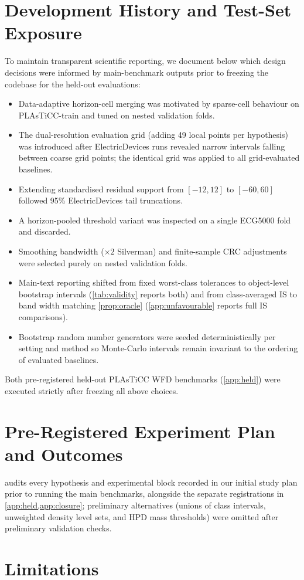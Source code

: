 \section{Development History and Test-Set Exposure}
\label{app:history}
To maintain transparent scientific reporting, we document below which design decisions were informed by main-benchmark outputs prior to freezing the codebase for the held-out evaluations:
\begin{itemize}
\item Data-adaptive horizon-cell merging was motivated by sparse-cell behaviour on PLAsTiCC-train and tuned on nested validation folds.
\item The dual-resolution evaluation grid (adding 49 local points per hypothesis) was introduced after ElectricDevices runs revealed narrow intervals falling between coarse grid points; the identical grid was applied to all grid-evaluated baselines.
\item Extending standardised residual support from $[-12,12]$ to $[-60,60]$ followed 95\% ElectricDevices tail truncations.
\item A horizon-pooled threshold variant was inspected on a single ECG5000 fold and discarded.
\item Smoothing bandwidth ($\times 2$ Silverman) and finite-sample CRC adjustments were selected purely on nested validation folds.
\item Main-text reporting shifted from fixed worst-class tolerances to object-level bootstrap intervals (\cref{tab:validity} reports both) and from class-averaged IS to band width matching \cref{prop:oracle} (\cref{app:unfavourable} reports full IS comparisons).
\item Bootstrap random number generators were seeded deterministically per setting and method so Monte-Carlo intervals remain invariant to the ordering of evaluated baselines.
\end{itemize}
Both pre-registered held-out PLAsTiCC WFD benchmarks (\cref{app:held}) were executed strictly after freezing all above choices.

\FloatBarrier
\section{Pre-Registered Experiment Plan and Outcomes}
\label{app:plan}
 audits every hypothesis and experimental block recorded in our initial study plan prior to running the main benchmarks, alongside the separate registrations in \cref{app:held,app:closure}; preliminary alternatives (unions of class intervals, unweighted density level sets, and HPD mass thresholds) were omitted after preliminary validation checks.
\FloatBarrier

\FloatBarrier

\FloatBarrier
\section{Limitations}
\label{app:limits}

